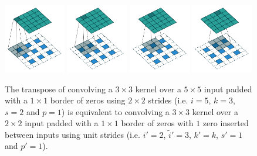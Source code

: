 \documentclass{report}
\begin{document}
\begin{figure}[p]
    \centering
    \includegraphics[width=0.24\textwidth]{pdf/padding_strides_transposed_00.pdf}
    \includegraphics[width=0.24\textwidth]{pdf/padding_strides_transposed_01.pdf}
    \includegraphics[width=0.24\textwidth]{pdf/padding_strides_transposed_02.pdf}
    \includegraphics[width=0.24\textwidth]{pdf/padding_strides_transposed_03.pdf}
    \caption{\label{fig:padding_strides_transposed} The transpose of convolving
        a $3 \times 3$ kernel over a $5 \times 5$ input padded with a $1 \times
        1$ border of zeros using $2 \times 2$ strides (i.e. $i = 5$, $k = 3$, $s
        = 2$ and $p = 1$) is equivalent to convolving a $3 \times 3$ kernel over
        a $2 \times 2$ input padded with a $1 \times 1$ border of zeros with $1$
        zero inserted between inputs using unit strides (i.e. $i' = 2$,
        $\tilde{i}' = 3$, $k' = k$, $s' = 1$ and $p' = 1$).}
\end{figure}
\end{document}
